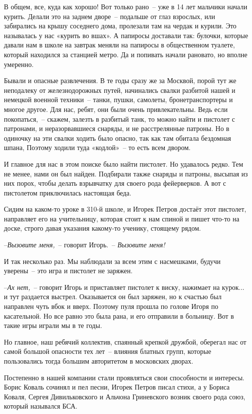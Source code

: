 В общем, все, куда как хорошо! Вот только рано~-- уже в 14 лет мальчики начали курить. Делали это на заднем дворе~-- подальше от глаз взрослых, или забирались на крышу соседнего дома, пролезали там на чердак и курили. Это называлась у нас «курить во вшах». А папиросы доставали так: булочки, которые давали нам в школе на завтрак меняли на папиросы в общественном туалете, который находился за станцией метро. Да и попивать начали рановато, но вполне умеренно.

Бывали и опасные развлечения. В те годы сразу же за Москвой, порой тут же неподалеку от железнодорожных путей, начинались свалки разбитой нашей и немецкой военной техники~-- танки, пушки, самолеты, бронетранспортеры и многое другое. Для нас, ребят, они были очень привлекательны. Ведь если покопаться,~-- скажем, залезть в разбитый танк, то можно найти и пистолет с патронами, и неразорвавшиеся снаряды, и не расстрелянные патроны. Но в одиночку на эти свалки ходить было опасно, так как там обитала бездомная шпана, Поэтому ходили туда «кодлой»~-- то есть всем двором.

И главное для нас в этом поиске было найти пистолет. Но удавалось редко. Тем не менее, нами он был найден. Подбирали также снаряды и патроны, высыпая из них порох, чтобы делать взрывчатку для своего рода фейерверков. А вот с пистолетом приключилась настоящая беда.

Сидим на каком-то уроке в 310-й школе, и Игорек Петров достаёт этот пистолет, направляет его на учительницу, которая стоит к нам спиной и пишет что-то на доске, строго давая указания какому-то ученику, стоящему рядом.

--\textit{Вызовите меня,}~-- говорит Игорь.~-- \textit{Вызовите меня!}

И так несколько раз. Мы наблюдали за всем этим с насмешками, будучи уверены~-- это игра и пистолет не заряжен.

--\textit{Ах нет,}~-- говорит Игорь и приставляет пистолет к виску, нажимает на курок... и тут раздается выстрел. Оказывается он был заряжен, но к счастью был направлен чуть вбок и вверх. Поэтому пуля прошла по голове Игоря по касательной. Но все равно это была рана, и его отправили в больницу. Вот в такие игры играли мы в те годы.

Но главное, наш ребячий коллектив, спаянный крепкой дружбой, оберегал нас от самой большой опасности тех лет~-- влияния блатных групп, которые пользовались тогда большим авторитетом в московских дворах.

Постепенно в нашей компании стали проявляться свои способности и интересы. Борис Коваль сочинял и пел песни, Игорек Петров писал стихи, а у Бориса Коваля, Сергея Дивильковского и Альчона Гриневского возник своего рода союз, который назывался БСА.

